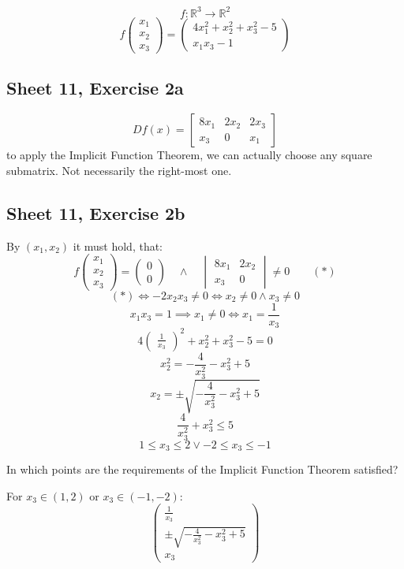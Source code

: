 \documentclass{article}
\begin{document}
\[ f: \mathbb R^3 \to \mathbb R^2 \]
\[ f\begin{pmatrix} x_1 \\ x_2 \\ x_3 \end{pmatrix} = \begin{pmatrix} 4x^2_1 + x_2^2 + x_3^2 - 5 \\ x_1 x_3 - 1 \end{pmatrix} \]

\subsection{Sheet 11, Exercise 2a}
\[ Df(x) = \begin{bmatrix} 8x_1 & 2x_2 & 2x_3 \\ x_3 & 0 & x_1 \end{bmatrix} \]
to apply the Implicit Function Theorem, we can actually choose any square submatrix. Not necessarily the right-most one.

\subsection{Sheet 11, Exercise 2b}
By $(x_1, x_2)$ it must hold, that:
\[
  f\begin{pmatrix} x_1 \\ x_2 \\ x_3 \end{pmatrix} = \begin{pmatrix} 0 \\ 0 \end{pmatrix}
  \quad\land\quad
  \begin{vmatrix} 8x_1 & 2x_2 \\ x_3 & 0 \end{vmatrix} \neq 0 \qquad (*)
\]
\[ (*) \iff -2x_2 x_3 \neq 0 \iff x_2 \neq 0 \land x_3 \neq 0 \]
\[ x_1 x_3 = 1 \implies x_1 \neq 0 \iff x_1 = \frac1{x_3}  \]
\[ 4 \begin{pmatrix} \frac1{x_3} \end{pmatrix}^2 + x_2^2 + x_3^2 - 5 = 0 \]
\[ x_2^2 = -\frac{4}{x_3^2} - x_3^2 + 5 \]
\[ x_2 = \pm \sqrt{-\frac{4}{x_3^2} - x_3^2 + 5} \]
\[ \frac{4}{x_3^2} + x_3^2 \leq 5 \]
\[ 1 \leq x_3 \leq 2 \lor -2 \leq x_3 \leq -1 \]

In which points are the requirements of the Implicit Function Theorem satisfied?

For $x_3 \in (1,2)$ or $x_3 \in (-1, -2)$:
\[ \begin{pmatrix} \frac{1}{x_3} \\ \pm \sqrt{-\frac{4}{x_3^2} - x_3^2 + 5} \\ x_3 \end{pmatrix} \]
\end{document}
